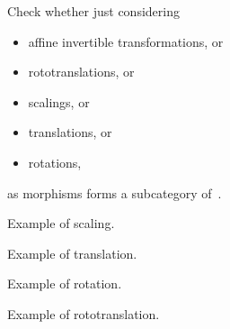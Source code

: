 \begin{exercise}
    \label{ex:draw}
    Check whether just considering
    \begin{itemize}
        \item affine invertible transformations, or
        \item rototranslations, or
        \item scalings, or
        \item translations, or
        \item rotations,
    \end{itemize}
    as morphisms forms a subcategory of~\Draw.
\end{exercise}
\begin{solution}
    \begin{marginfigure}
        \begin{center}
        \end{center}
        \caption{Example of scaling.}
    \end{marginfigure}

    \begin{marginfigure}
        \begin{center}
        \end{center}
        \caption{Example of translation.}
    \end{marginfigure}

    \begin{marginfigure}
        \begin{center}
        \end{center}
        \caption{Example of rotation.}
    \end{marginfigure}

    \begin{marginfigure}
        \begin{center}
        \end{center}
        \caption{Example of rototranslation.}
    \end{marginfigure}


\end{solution}
